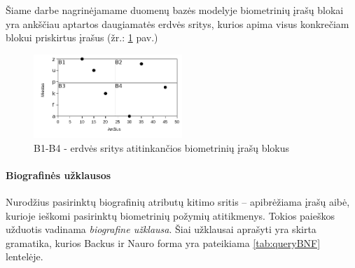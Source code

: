 Šiame darbe nagrinėjamame duomenų bazės modelyje biometrinių įrašų blokai yra ankščiau aptartos daugiamatės erdvės sritys, kurios apima visus konkrečiam blokui priskirtus įrašus (žr.: \ref{img:multidimensionalPartitionedGallery} pav.)

\begin{figure}[H]
\begin{center}
\includegraphics[width=0.5\textwidth]{img/MultidimensionalPartitionedGallery.png}
\caption{B1-B4 - erdvės sritys atitinkančios biometrinių įrašų blokus}
\label{img:multidimensionalPartitionedGallery}
\end{center}
\end{figure}



\paragraph{Biografinės užklausos}

Nurodžius pasirinktų biografinių atributų kitimo sritis -- apibrėžiama įrašų aibė, kurioje ieškomi pasirinktų biometrinių požymių atitikmenys.
Tokios paieškos užduotis vadinama {\it biografine užklausa}.
Šiai užklausai aprašyti yra skirta gramatika, kurios Backus ir Nauro forma \cite{mccracken2003backus} yra pateikiama \ref{tab:queryBNF} lentelėje.

